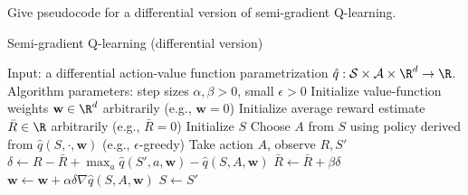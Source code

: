 
\begin{exercise}[Exercise 10.4]

Give pseudocode for a differential version of semi-gradient Q-learning.

\end{exercise}


\begin{solution}

\phantom{}

\FloatBarrier

\begin{algorithm}
    \caption{Semi-gradient Q-learning (differential version)}
    \begin{algorithmic}[1]
        \State Input: a differential action-value function parametrization $\hat{q}: \mathcal{S} \times \mathcal{A} \times \R^d \to \R$.
        \State Algorithm parameters: step sizes $\alpha, \beta > 0$, small $\epsilon > 0$
        \State Initialize value-function weights $\textbf{w} \in \R^d$ arbitrarily (e.g., $\textbf{w} = 0$)
        \State Initialize average reward estimate $\bar{R} \in \R$ arbitrarily (e.g., $\bar{R} = 0$)
            \State Initialize $S$
                \State Choose $A$ from $S$ using policy derived from $\hat{q}(S,\cdot,\textbf{w})$ (e.g., $\epsilon$-greedy)
                \State Take action $A$, observe $R, S'$
                \State $\delta \leftarrow R - \bar{R} + \max_a\hat{q}(S',a,\textbf{w}) - \hat{q}(S,A,\textbf{w})$
                \State $\bar{R} \leftarrow \bar{R} + \beta \delta$
                \State $\textbf{w} \leftarrow \textbf{w} + \alpha \delta \nabla \hat{q}(S,A,\textbf{w})$
                \State $S \leftarrow S'$
            \EndFor
        \EndWhile
    \end{algorithmic}
\end{algorithm}

\FloatBarrier

\end{solution}

